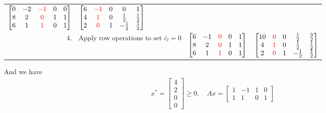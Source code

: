 \documentclass[12pt]{exam}
\begin{document}
\begin{questions}
\begin{parts}
\begin{table}[h!]
\begin{tabular}{rlcc}
                $\begin{bmatrix}
                0 & -2 & \textcolor{red}{-1} & 0 & 0\\
                8 & 2 & \textcolor{red}{0} & 1 & 1\\
                6 & 1 & \textcolor{red}{1} & 0 & 1\\
                \end{bmatrix}$ &
                $\begin{bmatrix}
                6 & \textcolor{red}{-1} & 0 & 0 & 1\\
                4 & \textcolor{red}{1} & 0 & \frac{1}{2} & \frac{1}{2}\\
                2 & \textcolor{red}{0} & 1 & -\frac{1}{2} & \frac{1}{2}\\
                \end{bmatrix}$  \\
            4.& Apply row operations to set $\bar c_l = 0$ & 
                $\begin{bmatrix}
                6 & -1 & \textcolor{red}{0} & 0 & 1\\
                8 & 2 & \textcolor{red}{0} & 1 & 1\\
                6 & 1 & \textcolor{red}{1} & 0 & 1\\
                \end{bmatrix}$ &
                $\begin{bmatrix}
                10 & \textcolor{red}{0} & 0 & \frac{1}{2} & \frac{3}{2}\\
                4 & \textcolor{red}{1} & 0 & \frac{1}{2} & \frac{1}{2}\\
                2 & \textcolor{red}{0} & 1 & -\frac{1}{2} & \frac{1}{2}\\
                \end{bmatrix}$ \\
            \hline
        \end{tabular}
        \end{table}
        And we have
        \begin{align*}
            x^* = \begin{bmatrix}4 \\ 2 \\ 0 \\ 0\end{bmatrix} \geq 0,
            \quad Ax = \begin{bmatrix}1&-1&1&0\\ 1&1&0&1 \end{bmatrix}

\end{align*}
\end{parts}
\end{questions}
\end{document}
